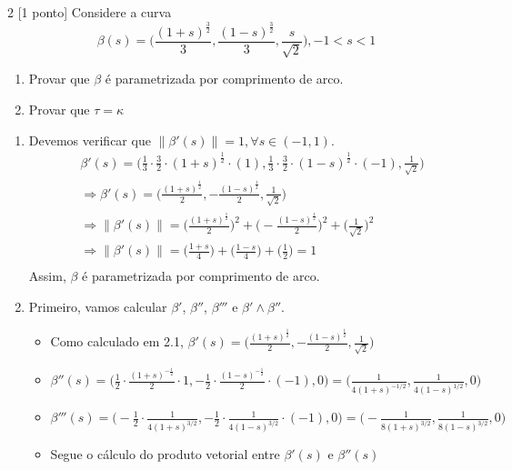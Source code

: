 \documentclass[../main.tex]{subfiles}
\begin{document}
		\begin{exercicio}{2}
			[1 ponto] Considere a curva
			\[
			\beta(s)=\bigg(\frac{(1+s)^{\tfrac{3}{2}}}{3},\frac{(1-s)^{\tfrac{3}{2}}}{3}, \frac{s}{\sqrt{2}}\bigg), -1<s<1
			\]
			\begin{enumerate}
				\item Provar que $\beta$ é parametrizada por comprimento de arco.
				\item Provar que $\tau=\kappa$
			\end{enumerate}
		\end{exercicio}
		\begin{solucao}
			\begin{enumerate}
				\item Devemos verificar que $\|\beta'(s)\|=1, \forall s\in (-1,1)$.
				\begin{align*}
					&\beta'(s)=\bigg(\frac{1}{3}\cdot \frac{3}{2}\cdot (1+s)^{\tfrac{1}{2}}\cdot (1),\frac{1}{3}\cdot \frac{3}{2}\cdot (1-s)^{\tfrac{1}{2}}\cdot (-1), \frac{1}{\sqrt{2}}\bigg)\\
					&\Rightarrow\beta'(s)=\bigg(\frac{(1+s)^{\tfrac{1}{2}}}{2},-\frac{(1-s)^{\tfrac{1}{2}}}{2}, \frac{1}{\sqrt{2}}\bigg)\\
					&\Rightarrow\|\beta'(s)\|=\bigg(\frac{(1+s)^{\tfrac{1}{2}}}{2}\bigg)^2+\bigg(-\frac{(1-s)^{\tfrac{1}{2}}}{2}\bigg)^2+ \bigg(\frac{1}{\sqrt{2}}\bigg)^2\\
					&\Rightarrow\|\beta'(s)\|=\bigg(\frac{1+s}{4}\bigg)+\bigg(\frac{1-s}{4}\bigg)+ \bigg(\frac{1}{2}\bigg)=1\\
				\end{align*}
				Assim, $\beta$ é parametrizada por comprimento de arco.
				\item Primeiro, vamos calcular $\beta'$, $\beta ''$, $\beta '''$ e $\beta'\wedge\beta''$.
				\begin{itemize}
					\item Como calculado em 2.1, $\beta'(s)=\bigg(\frac{(1+s)^{\tfrac{1}{2}}}{2},-\frac{(1-s)^{\tfrac{1}{2}}}{2}, \frac{1}{\sqrt{2}}\bigg)$
					\item $\beta''(s)=\bigg(\tfrac{1}{2}\cdot \frac{(1+s)^{-\tfrac{1}{2}}}{2}\cdot 1,-\tfrac{1}{2}\cdot \frac{(1-s)^{-\tfrac{1}{2}}}{2}\cdot (-1),0\bigg)=\bigg(\frac{1}{4(1+s)^{-1/2}},\frac{1}{4(1-s)^{1/2}},0\bigg)$
					\item $\beta'''(s)=\bigg(-\tfrac{1}{2}\cdot\frac{1}{4(1+s)^{3/2}},-\tfrac{1}{2}\cdot \frac{1}{4(1-s)^{3/2}}\cdot(-1),0\bigg)=\bigg(-\frac{1}{8(1+s)^{3/2}},\frac{1}{8(1-s)^{3/2}},0\bigg)$
					\item Segue o cálculo do produto vetorial entre $\beta'(s)$ e $\beta''(s)$
					

\end{itemize}
\end{enumerate}
\end{solucao}
\end{document}
